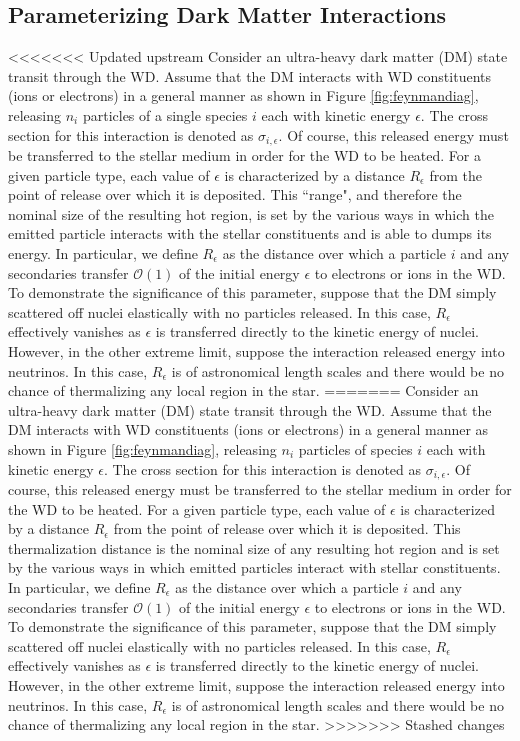 \documentclass[twocolumn,showpacs,preprintnumbers,amsmath,amssymb,prl]{revtex4}
\newcommand{\OO}{\mathcal{O}}
\begin{document}
\subsection{Parameterizing Dark Matter Interactions}
<<<<<<< Updated upstream
Consider an ultra-heavy dark matter (DM) state transit through the WD. Assume that the DM interacts with WD constituents (ions or electrons) in a general manner as shown in Figure \ref{fig:feynmandiag}, releasing $n_i$ particles of a single species $i$ each with kinetic energy $\epsilon$. The cross section for this interaction is denoted as $\sigma_{i,\epsilon}$. Of course, this released energy must be transferred to the stellar medium in order for the WD to be heated. For a given particle type, each value of $\epsilon$ is characterized by a distance $R_\epsilon$ from the point of release over which it is deposited. This ``range", and therefore the nominal size of the resulting hot region, is set by the various ways in which the emitted particle interacts with the stellar constituents and is able to dumps its energy. In particular, we define $R_\epsilon$ as the distance over which a particle $i$ and any secondaries transfer $\OO(1)$ of the initial energy $\epsilon$ to electrons or ions in the WD. To demonstrate the significance of this parameter, suppose that the DM simply scattered off nuclei elastically with no particles released. In this case, $R_\epsilon$ effectively vanishes as $\epsilon$ is transferred directly to the kinetic energy of nuclei. However, in the other extreme limit, suppose the interaction released energy into neutrinos. In this case, $R_\epsilon$ is of astronomical length scales and there would be no chance of thermalizing any local region in the star.
=======
Consider an ultra-heavy dark matter (DM) state transit through the WD. Assume that the DM interacts with WD constituents (ions or electrons) in a general manner as shown in Figure \ref{fig:feynmandiag}, releasing $n_i$ particles of species $i$ each with kinetic energy $\epsilon$. The cross section for this interaction is denoted as $\sigma_{i,\epsilon}$. Of course, this released energy must be transferred to the stellar medium in order for the WD to be heated. For a given particle type, each value of $\epsilon$ is characterized by a distance $R_\epsilon$ from the point of release over which it is deposited. This thermalization distance is the nominal size of any resulting hot region and is set by the various ways in which emitted particles interact with stellar constituents. In particular, we define $R_\epsilon$ as the distance over which a particle $i$ and any secondaries transfer $\OO(1)$ of the initial energy $\epsilon$ to electrons or ions in the WD. To demonstrate the significance of this parameter, suppose that the DM simply scattered off nuclei elastically with no particles released. In this case, $R_\epsilon$ effectively vanishes as $\epsilon$ is transferred directly to the kinetic energy of nuclei. However, in the other extreme limit, suppose the interaction released energy into neutrinos. In this case, $R_\epsilon$ is of astronomical length scales and there would be no chance of thermalizing any local region in the star. 
>>>>>>> Stashed changes
\end{document}

